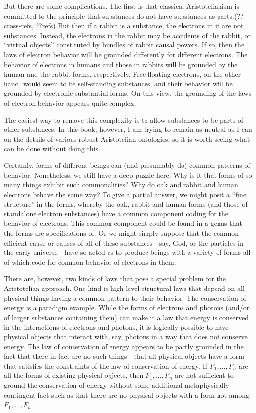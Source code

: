 But there are some complications. The first is that classical Aristotelianism is committed to the principle that 
substances do not have substances as parts.(??cross-refs, ??refs) But then if a rabbit is a substance, the electrons in
it are not substances. Instead, the electrons in the rabbit may be accidents of the rabbit, or ``virtual objects'' 
constituted by bundles of rabbit causal powers. If so, then the laws of electron behavior will be grounded differently
for different electrons. The behavior of electrons in humans and those in rabbits will be grounded by the human and the 
rabbit forms, respectively. Free-floating electrons, on the other hand, would seem to be self-standing substances, and
their behavior will be grounded by electronic substantial forms. On this view, the grounding of the laws of electron 
behavior appears quite complex.

The easiest way to remove this complexity is to allow substances to be parts of other substances. In this book, however, 
I am trying to remain as neutral as I can on the details of various robust Aristotelian ontologies, so it is worth seeing
what can be done without doing this.

Certainly, forms of different beings can (and presumably do) common patterns of behavior.  Nonetheless, we still have a 
deep puzzle here. Why is it that forms of so many things exhibit such commonalities? Why do oak and rabbit and human
electrons behave the same way? To give a partial answer, we might posit a ``fine structure'' in the forms, whereby the oak, 
rabbit and human forms (and those of standalone electron substances) have a common component coding for the behavior of 
electrons. This common component could be found in a genus that the forms are specifications of. Or we might simply suppose
that the common efficient cause or causes of all of these substances---say, God, or the particles in the early universe---have
so acted as to produce beings with a variety of forms all of which code for common behavior of electrons in them. 

There are, however, two kinds of laws that pose a special problem for the Aristotelian approach. One kind is high-level
structural laws that depend on all physical things having a common pattern to their behavior. The conservation of energy
is a paradigm example. While the forms of electrons and photons (and/or of larger substances containing them) can make 
it a law that energy is conserved in the interactions of electrons and photons, it is logically possible to have 
physical objects that interact with, say, photons in a way that does not conserve energy. The law of conservation of 
energy appears to be partly grounded in the fact that there in fact are no such things---that all physical objects have a 
form that satisfies the constraints of the law of conservation of energy. If $F_1,...,F_n$ are all the forms
of existing physical objects, then $F_1,...,F_n$ are not sufficient to ground the conservation of energy without some
additional metaphysically contingent fact such as that there are no physical objects with a form not among $F_1,...,F_n$. 

